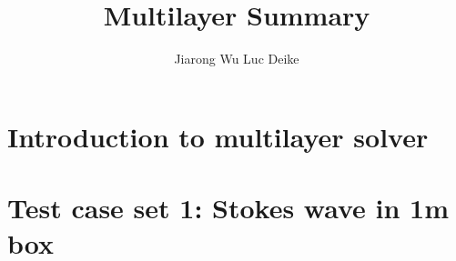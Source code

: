 \documentclass{article}
\title{Multilayer Summary}
\author{
Jiarong Wu
   \And
Luc Deike
}
\begin{document}
\maketitle


\section{Introduction to multilayer solver}

\section{Test case set 1: Stokes wave in 1m box}
\end{document}
